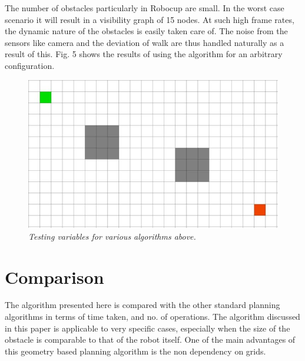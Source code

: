 \documentclass[letterpaper, 10 pt, conference]{ieeeconf}  %
\begin{document}
The number of obstacles particularly in Robocup are small. In the worst case scenario it will result in a visibility graph of 15 nodes. At such high frame rates, the dynamic nature of the obstacles is easily taken care of. The noise from the sensors like camera and the deviation of walk are thus handled naturally as a result of this. Fig. 5 shows the results of using the algorithm for an arbitrary configuration.
\\

\begin{figure}[t]  
\begin{center}  
\includegraphics[scale=0.4]{testbed.jpg}  
\caption{\small \sl Testing variables for various algorithms above.\label{fig:test3}}  
\end{center}  
\end{figure}



\section{Comparison}
The algorithm presented here is compared with the other standard planning algorithms in terms of time taken, and no. of operations. The algorithm discussed in this paper is applicable to very specific cases, especially when the size of the obstacle is comparable to that of the robot itself. One of the main advantages of this geometry based planning algorithm is the non dependency on grids.
\end{document}

